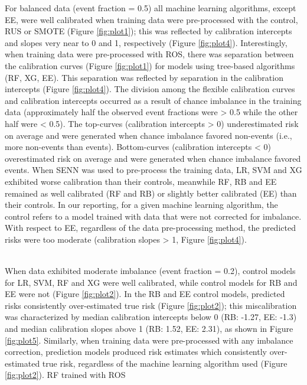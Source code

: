 \documentclass[AMA,STIX1COL,]{WileyNJD-v2}
\begin{document}
\hfill\break
For balanced data (event fraction = 0.5) all machine learning
algorithms, except EE, were well calibrated when training data were
pre-processed with the control, RUS or SMOTE (Figure \ref{fig:plot1});
this was reflected by calibration intercepts and slopes very near to 0
and 1, respectively (Figure \ref{fig:plot4}). Interestingly, when
training data were pre-processed with ROS, there was separation between
the calibration curves (Figure \ref{fig:plot1}) for models using
tree-based algorithms (RF, XG, EE). This separation was reflected by
separation in the calibration intercepts (Figure \ref{fig:plot4}). The
division among the flexible calibration curves and calibration
intercepts occurred as a result of chance imbalance in the training data
(approximately half the observed event fractions were \textgreater{} 0.5
while the other half were \textless{} 0.5). The top-curves (calibration
intercepts \textgreater{} 0) underestimated risk on average and were
generated when chance imbalance favored non-events (i.e., more
non-events than events). Bottom-curves (calibration intercepts
\textless{} 0) overestimated risk on average and were generated when
chance imbalance favored events. When SENN was used to pre-process the
training data, LR, SVM and XG exhibited worse calibration than their
controls, meanwhile RF, RB and EE remained as well calibrated (RF and
RB) or slightly better calibrated (EE) than their controls. In our
reporting, for a given machine learning algorithm, the control refers to
a model trained with data that were not corrected for imbalance. With
respect to EE, regardless of the data pre-processing method, the
predicted risks were too moderate (calibration slopes \textgreater{} 1,
Figure \ref{fig:plot4}).\\
\strut \\
When data exhibited moderate imbalance (event fraction = 0.2), control
models for LR, SVM, RF and XG were well calibrated, while control models
for RB and EE were not (Figure \ref{fig:plot2}). In the RB and EE
control models, predicted risks consistently over-estimated true risk
(Figure \ref{fig:plot2}); this miscalibration was characterized by
median calibration intercepts below 0 (RB: -1.27, EE: -1.3) and median
calibration slopes above 1 (RB: 1.52, EE: 2.31), as shown in Figure
\ref{fig:plot5}. Similarly, when training data were pre-processed with
any imbalance correction, prediction models produced risk estimates
which consistently over-estimated true risk, regardless of the machine
learning algorithm used (Figure \ref{fig:plot2}). RF trained with ROS
\end{document}
